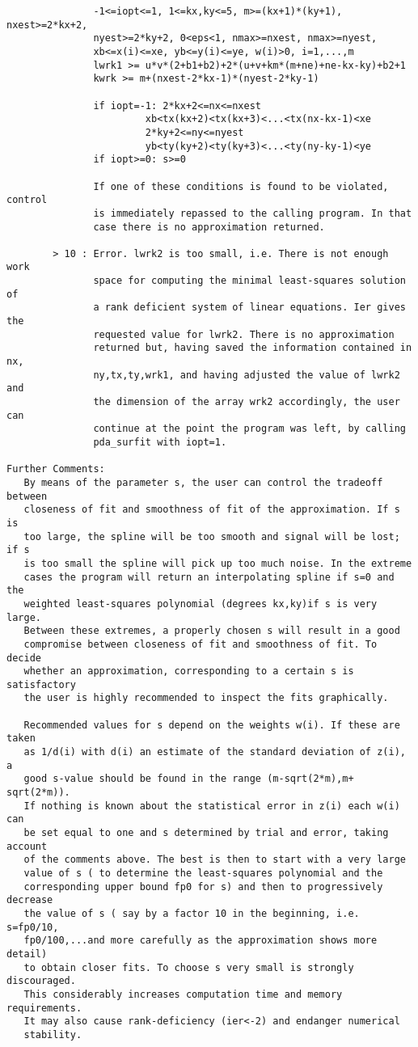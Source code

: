 \begin{verbatim}
               -1<=iopt<=1, 1<=kx,ky<=5, m>=(kx+1)*(ky+1), nxest>=2*kx+2,
               nyest>=2*ky+2, 0<eps<1, nmax>=nxest, nmax>=nyest,
               xb<=x(i)<=xe, yb<=y(i)<=ye, w(i)>0, i=1,...,m
               lwrk1 >= u*v*(2+b1+b2)+2*(u+v+km*(m+ne)+ne-kx-ky)+b2+1
               kwrk >= m+(nxest-2*kx-1)*(nyest-2*ky-1)

               if iopt=-1: 2*kx+2<=nx<=nxest
                        xb<tx(kx+2)<tx(kx+3)<...<tx(nx-kx-1)<xe
                        2*ky+2<=ny<=nyest
                        yb<ty(ky+2)<ty(ky+3)<...<ty(ny-ky-1)<ye
               if iopt>=0: s>=0

               If one of these conditions is found to be violated, control
               is immediately repassed to the calling program. In that
               case there is no approximation returned.

        > 10 : Error. lwrk2 is too small, i.e. There is not enough work
               space for computing the minimal least-squares solution of
               a rank deficient system of linear equations. Ier gives the
               requested value for lwrk2. There is no approximation
               returned but, having saved the information contained in nx,
               ny,tx,ty,wrk1, and having adjusted the value of lwrk2 and
               the dimension of the array wrk2 accordingly, the user can
               continue at the point the program was left, by calling
               pda_surfit with iopt=1.

Further Comments:
   By means of the parameter s, the user can control the tradeoff between
   closeness of fit and smoothness of fit of the approximation. If s is
   too large, the spline will be too smooth and signal will be lost; if s
   is too small the spline will pick up too much noise. In the extreme
   cases the program will return an interpolating spline if s=0 and the
   weighted least-squares polynomial (degrees kx,ky)if s is very large.
   Between these extremes, a properly chosen s will result in a good
   compromise between closeness of fit and smoothness of fit. To decide
   whether an approximation, corresponding to a certain s is satisfactory
   the user is highly recommended to inspect the fits graphically.

   Recommended values for s depend on the weights w(i). If these are taken
   as 1/d(i) with d(i) an estimate of the standard deviation of z(i), a
   good s-value should be found in the range (m-sqrt(2*m),m+ sqrt(2*m)).
   If nothing is known about the statistical error in z(i) each w(i) can
   be set equal to one and s determined by trial and error, taking account
   of the comments above. The best is then to start with a very large
   value of s ( to determine the least-squares polynomial and the
   corresponding upper bound fp0 for s) and then to progressively decrease
   the value of s ( say by a factor 10 in the beginning, i.e. s=fp0/10,
   fp0/100,...and more carefully as the approximation shows more detail)
   to obtain closer fits. To choose s very small is strongly discouraged.
   This considerably increases computation time and memory requirements.
   It may also cause rank-deficiency (ier<-2) and endanger numerical
   stability.


\end{verbatim}
